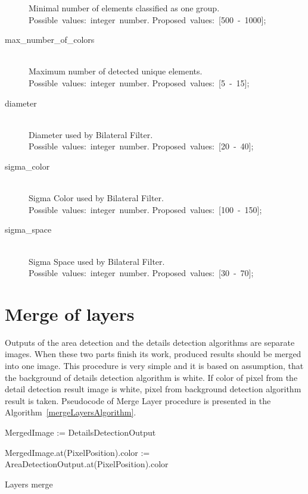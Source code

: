 \documentclass[a4paper,onecolumn,oneside,12pt]{memoir}
\begin{document}
\begin{description}
    Minimal number of elements classified as one group. \\
    Possible~values:~integer~number. Proposed~values:~[500~-~1000];
  \item[max\_number\_of\_colors] \hfill \\
    Maximum number of detected unique elements. \\
    Possible~values:~integer~number. Proposed~values:~[5~-~15];
  \item[diameter] \hfill \\
    Diameter used by Bilateral Filter. \\
    Possible~values:~integer~number. Proposed~values:~[20~-~40];
  \item[sigma\_color] \hfill \\
    Sigma Color used by Bilateral Filter. \\
    Possible~values:~integer~number. Proposed~values:~[100~-~150];
  \item[sigma\_space] \hfill \\
    Sigma Space used by Bilateral Filter. \\
    Possible~values:~integer~number. Proposed~values:~[30~-~70];
\end{description}

\section{Merge of layers}

Outputs of the area detection and the details detection algorithms are separate images. When these
two parts finish its work, produced results should be merged into one image. This procedure is very
simple and it is based on assumption, that the background of details detection algorithm is white.
If color of pixel from the detail detection result image is white, pixel from background detection
algorithm result is taken. Pseudocode of Merge Layer procedure is presented in the 
Algorithm~\ref{mergeLayersAlgorithm}.

\begin{algorithm}[!ht]

  MergedImage := DetailsDetectionOutput\;

  {
    {
      MergedImage.at(PixelPosition).color := AreaDetectionOutput.at(PixelPosition).color\;
    }
  }


  \caption{Layers merge}
  \label{mergeLayersAlgorithm}
\end{algorithm}
\end{document}
